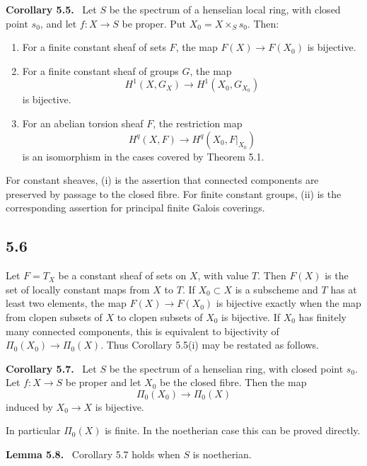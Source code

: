 \documentclass[11pt]{article}
\newenvironment{statement}[1]{\par\medskip\noindent\textbf{#1.}\ }{\par\medskip}
\begin{document}
\begin{statement}{Corollary 5.5}
Let \(S\) be the spectrum of a henselian local ring, with closed point \(s_0\), and let \(f:X\to S\) be proper. Put \(X_0=X\times_Ss_0\). Then:
\begin{enumerate}[label=(\roman*)]
\item For a finite constant sheaf of sets \(F\), the map \(F(X)\to F(X_0)\) is bijective.
\item For a finite constant sheaf of groups \(G\), the map
\[
H^1(X,G_X)\longrightarrow H^1(X_0,G_{X_0})
\]
is bijective.
\item For an abelian torsion sheaf \(F\), the restriction map
\[
H^q(X,F)\longrightarrow H^q(X_0,F|_{X_0})
\]
is an isomorphism in the cases covered by Theorem 5.1.
\end{enumerate}
\end{statement}

For constant sheaves, (i) is the assertion that connected components are preserved by passage to the closed fibre. For finite constant groups, (ii) is the corresponding assertion for principal finite Galois coverings.

\subsection*{5.6}
Let \(F=T_X\) be a constant sheaf of sets on \(X\), with value \(T\). Then \(F(X)\) is the set of locally constant maps from \(X\) to \(T\). If \(X_0\subset X\) is a subscheme and \(T\) has at least two elements, the map \(F(X)\to F(X_0)\) is bijective exactly when the map from clopen subsets of \(X\) to clopen subsets of \(X_0\) is bijective. If \(X_0\) has finitely many connected components, this is equivalent to bijectivity of \(\Pi_0(X_0)\to\Pi_0(X)\). Thus Corollary 5.5(i) may be restated as follows.

\begin{statement}{Corollary 5.7}
Let \(S\) be the spectrum of a henselian ring, with closed point \(s_0\). Let \(f:X\to S\) be proper and let \(X_0\) be the closed fibre. Then the map
\[
\Pi_0(X_0)\longrightarrow\Pi_0(X)
\]
induced by \(X_0\to X\) is bijective.
\end{statement}

In particular \(\Pi_0(X)\) is finite. In the noetherian case this can be proved directly.

\begin{statement}{Lemma 5.8}
Corollary 5.7 holds when \(S\) is noetherian.
\end{statement}
\end{document}

